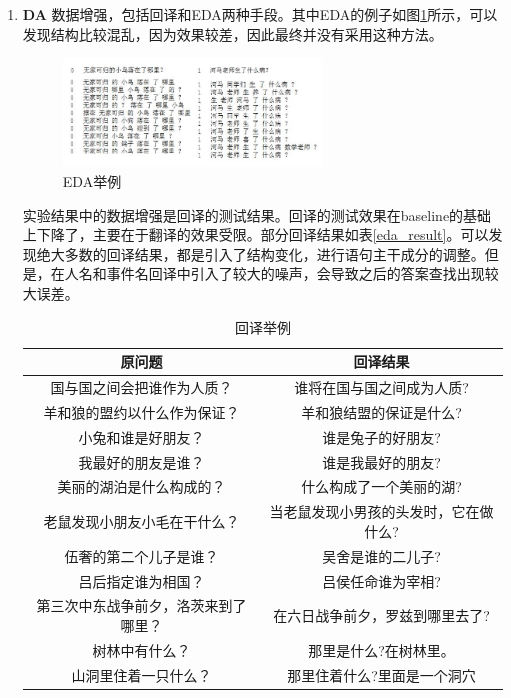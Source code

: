 \documentclass[10pt, a4]{extarticle}
\begin{document}
\begin{enumerate}
	\item \textbf{DA} 数据增强，包括回译和EDA两种手段。其中EDA的例子如图\ref{eda}所示，可以发现结构比较混乱，因为效果较差，因此最终并没有采用这种方法。
	\begin{figure}[H]
		\centering
		\includegraphics[width=0.65\textwidth]{figure/eda.jpg}
		\caption{EDA举例}
		\label{eda}
	\end{figure}
	实验结果中的数据增强是回译的测试结果。回译的测试效果在baseline的基础上下降了，主要在于翻译的效果受限。部分回译结果如表\ref{eda_result}。可以发现绝大多数的回译结果，都是引入了结构变化，进行语句主干成分的调整。但是，在人名和事件名回译中引入了较大的噪声，会导致之后的答案查找出现较大误差。
	\begin{table}[H]
		\centering
		\caption{回译举例}
		\begin{tabular}{cc}
		\toprule  %
		原问题 & 回译结果  \\
		\midrule  %
		国与国之间会把谁作为人质？& 谁将在国与国之间成为人质?  \\
		羊和狼的盟约以什么作为保证？& 羊和狼结盟的保证是什么? \\
		小兔和谁是好朋友？& 谁是兔子的好朋友? \\
		 我最好的朋友是谁？ & 谁是我最好的朋友?  \\
		美丽的湖泊是什么构成的？   & 什么构成了一个美丽的湖?  \\
		\midrule  %
		 老鼠发现小朋友小毛在干什么？ & 当老鼠发现小男孩的头发时，它在做什么? \\
		 伍奢的第二个儿子是谁？  & 吴舍是谁的二儿子?  \\
		 吕后指定谁为相国？  &  吕侯任命谁为宰相? \\
		 第三次中东战争前夕，洛茨来到了哪里？  & 在六日战争前夕，罗兹到哪里去了?  \\
		\midrule  %
		 树林中有什么？  & 那里是什么?在树林里。  \\
		 山洞里住着一只什么？    & 那里住着什么?里面是一个洞穴  \\
		\bottomrule %
		\end{tabular}

\end{table}
\end{enumerate}
\end{document}
